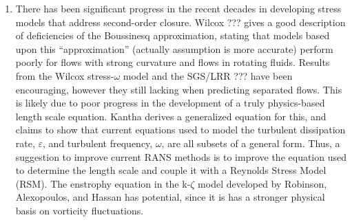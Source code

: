\documentclass[a4paper]{article}
\begin{document}
\begin{enumerate}
  \item There has been significant progress in the recent decades in developing
    stress models that address second-order closure.  Wilcox ??? gives a good
    description of deficiencies of the Boussinesq approximation, stating that
    models based upon this ``approximation'' (actually assumption is more
    accurate) perform poorly for flows with strong curvature and flows in
    rotating fluids.  Results from the Wilcox stress-$\omega$ model and the
    SGS/LRR ??? have been encouraging, however they still lacking when
    predicting separated flows.  This is likely due to poor progress in the
    development of a truly physics-based length scale equation.
    Kantha\cite{Kantha} derives a generalized equation for this, and claims to
    show that current equations used to model the turbulent dissipation rate,
    $\varepsilon$, and turbulent frequency, $\omega$, are all subsets of a
    general form.  Thus, a suggestion to improve current RANS methods is to
    improve the equation used to determine the length scale and couple it with a
    Reynolds Stress Model (RSM).  The enstrophy equation in the k-$\zeta$ model
    developed by Robinson, Alexopoulos, and Hassan\cite{Robinson} has potential,
    since it is has a stronger physical basis on vorticity fluctuations.


\end{enumerate}
\end{document}
